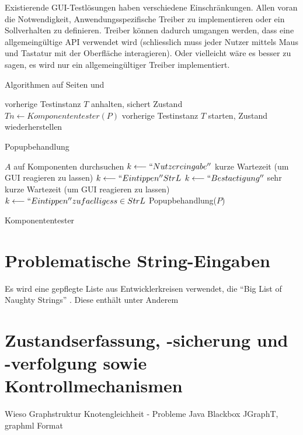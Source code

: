 Existierende GUI-Testlösungen haben verschiedene Einschränkungen. Allen voran die
Notwendigkeit, Anwendungsspezifische Treiber zu implementieren oder ein Sollverhalten zu definieren.
Treiber können dadurch umgangen werden, dass eine allgemeingültige API verwendet wird (schliesslich 
muss jeder Nutzer mittels Maus und Tastatur mit der Oberfläche interagieren). Oder vielleicht
wäre es besser zu sagen, es wird nur ein allgemeingültiger Treiber implementiert.



Algorithmen auf Seiten \pageref{alg:autotesterpopup} und \pageref{alg:autotestermain}


\begin{algorithm} \SetAlgoLined
	vorherige Testinstanz $T$ anhalten, sichert Zustand\;
	$Tn \longleftarrow Komponententester(P)$\;
	vorherige Testinstanz $T$ starten, Zustand wiederherstellen\;
	\caption{Popupbehandlung}
	\label{alg:autotesterpopup}
\end{algorithm}

\begin{algorithm} \SetAlgoLined
	$A$ auf Komponenten durchsuchen\;
	{
		{
			$k \longleftarrow ``Nutzereingabe''$\;
			kurze Wartezeit (um GUI reagieren zu lassen)
		}
		{
			{
				$k \longleftarrow ``Eintippen'' StrL$\;
				$k \longleftarrow ``Bestaetigung''$\;
				sehr kurze Wartezeit (um GUI reagieren zu lassen)
			}
			$k \longleftarrow ``Eintippen'' zufaelliges s \in StrL$\;
		}
		{
			Popupbehandlung($P$)\;
		}
	}
	\caption{Komponententester}
	\label{alg:autotestermain}
\end{algorithm}


\section{Problematische String-Eingaben}\label{section:naughtystrings}

Es wird eine gepflegte Liste aus Entwicklerkreisen verwendet, die ``Big List of Naughty Strings'' 
\cite{website:naughty-strings}. Diese enthält unter Anderem


\section{Zustandserfassung, -sicherung und -verfolgung sowie Kontrollmechanismen}\label{section:statemonitoring}

Wieso Graphstruktur
Knotengleichheit - Probleme Java Blackbox
JGraphT, graphml Format
